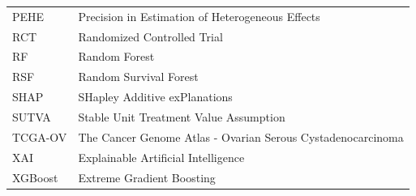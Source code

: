 \begin{longtable}[]{@{}
  >{\raggedright\arraybackslash}p{}
  >{\raggedright\arraybackslash}p{}@{}}
PEHE & Precision in Estimation of Heterogeneous Effects \\
RCT & Randomized Controlled Trial \\
RF & Random Forest \\
RSF & Random Survival Forest \\
SHAP & SHapley Additive exPlanations \\
SUTVA & Stable Unit Treatment Value Assumption \\
TCGA-OV & The Cancer Genome Atlas - Ovarian Serous Cystadenocarcinoma \\
XAI & Explainable Artificial Intelligence \\
XGBoost & Extreme Gradient Boosting \\
\end{longtable}

